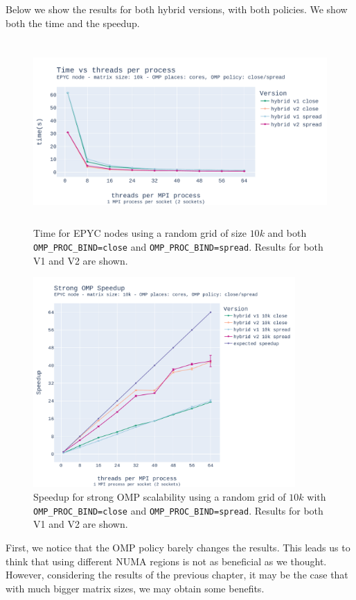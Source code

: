 \documentclass{report}
\begin{document}
Below we show the results for both hybrid versions, with both policies. We show 
both the time and the speedup.

\begin{figure}[H]
\centering
\includegraphics[width=14cm, height=7cm]{./images/strong_OMP_epyc_hybrid_grid_010k.pdf}
\caption{\label{fig:strongomp10kepyc} Time for EPYC nodes using a random grid of size 
$10k$ and both \texttt{OMP\_PROC\_BIND=close} and \texttt{OMP\_PROC\_BIND=spread}. 
Results for both V1 and V2 are shown.}
\end{figure}

\begin{figure}[H]
\centering
\includegraphics[width=10cm, height=8cm]{./images/strong_OMP_epyc_hybrid_grid_010k_speedup.pdf}
\caption{\label{fig:strongomp10kspeedupepyc} Speedup for strong OMP scalability using a random 
grid of $10k$ with \texttt{OMP\_PROC\_BIND=close} and \texttt{OMP\_PROC\_BIND=spread}. Results 
for both V1 and V2 are shown.}
\end{figure}

First, we notice that the OMP policy barely changes the results. This leads us 
to think that using different NUMA regions is not as beneficial as we thought. 
However, considering the results of the previous chapter, it may be the case 
that with much bigger matrix sizes, we may obtain some benefits.
\end{document}
